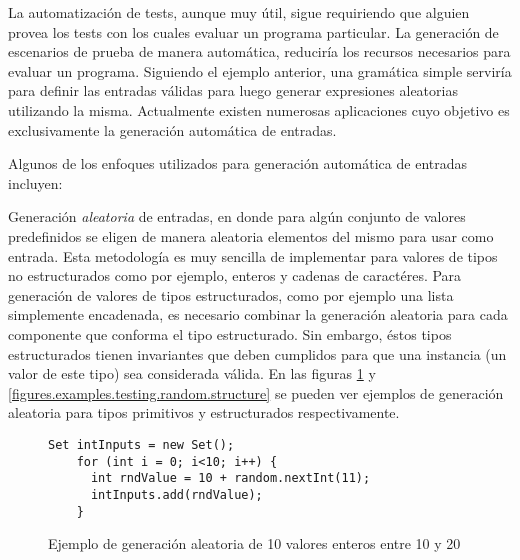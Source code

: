 La automatizaci\'on de tests, aunque muy \'util, sigue requiriendo que alguien provea los tests con los cuales evaluar un programa particular. La generaci\'on de escenarios de prueba de manera autom\'atica, reducir\'ia los recursos necesarios para evaluar un programa. Siguiendo el ejemplo anterior, una gram\'atica simple servir\'ia para definir las entradas v\'alidas para luego generar expresiones aleatorias utilizando la misma. Actualmente existen numerosas aplicaciones cuyo objetivo es exclusivamente la generaci\'on autom\'atica de entradas.

Algunos de los enfoques utilizados para generaci\'on autom\'atica de entradas incluyen:

Generaci\'on \emph{aleatoria} de entradas, en donde para alg\'un conjunto de valores predefinidos se eligen de manera aleatoria elementos del mismo para usar como entrada. Esta metodolog\'ia es muy sencilla de implementar para valores de tipos no estructurados como por ejemplo, enteros y cadenas de caract\'eres. Para generaci\'on de valores de tipos estructurados, como por ejemplo una lista simplemente encadenada, es necesario combinar la generaci\'on aleatoria para cada componente que conforma el tipo estructurado. Sin embargo, \'estos tipos estructurados tienen invariantes que deben cumplidos para que una instancia (un valor de este tipo) sea considerada v\'alida. En las figuras \ref{figures.examples.testing.random.primitive} y \ref{figures.examples.testing.random.structure} se pueden ver ejemplos de generaci\'on aleatoria para tipos primitivos y estructurados respectivamente. %

\begin{figure}
	\begin{lstlisting}[frame=single, mathescape=true,framexleftmargin=1.5em]
    Set intInputs = new Set();
    for (int i = 0; i<10; i++) {
      int rndValue = 10 + random.nextInt(11);
      intInputs.add(rndValue);
    }
	\end{lstlisting}
	\caption{Ejemplo de generaci\'on aleatoria de 10 valores enteros entre 10 y 20}
	\label{figures.examples.testing.random.primitive}
\end{figure}

